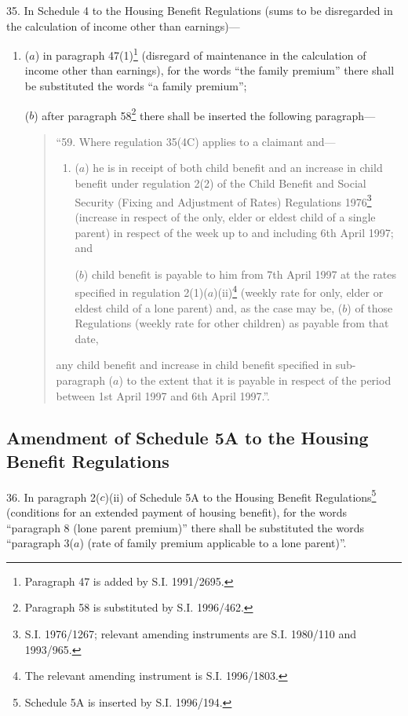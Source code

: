 \documentclass[12pt,a4paper]{article}
\begin{document}
35.  In Schedule 4 to the Housing Benefit Regulations (sums to be disregarded in the calculation of income other than earnings)—
\begin{enumerate}\item[]
($a$) in paragraph 47(1)\footnote{\frenchspacing Paragraph 47 is added by S.I. 1991/2695.} (disregard of maintenance in the calculation of income other than earnings), for the words “the family premium” there shall be substituted the words “a family premium”;

($b$) after paragraph 58\footnote{\frenchspacing Paragraph 58 is substituted by S.I. 1996/462.} there shall be inserted the following paragraph—
\begin{quotation}
“59.  Where regulation 35(4C) applies to a claimant and—
\begin{enumerate}\item[]
($a$) he is in receipt of both child benefit and an increase in child benefit under regulation 2(2) of the Child Benefit and Social Security (Fixing and Adjustment of Rates) Regulations 1976\footnote{\frenchspacing S.I. 1976/1267; relevant amending instruments are S.I. 1980/110 and 1993/965.} (increase in respect of the only, elder or eldest child of a single parent) in respect of the week up to and including 6th April 1997; and

($b$) child benefit is payable to him from 7th April 1997 at the rates specified in regulation 2(1)($a$)(ii)\footnote{\frenchspacing The relevant amending instrument is S.I. 1996/1803.} (weekly rate for only, elder or eldest child of a lone parent) and, as the case may be, ($b$) of those Regulations (weekly rate for other children) as payable from that date,
\end{enumerate}
any child benefit and increase in child benefit specified in sub-paragraph ($a$) to the extent that it is payable in respect of the period between 1st April 1997 and 6th April 1997.”.
\end{quotation}
\end{enumerate}

\subsection[36. Amendment of Schedule 5A to the Housing Benefit Regulations]{Amendment of Schedule 5A to the Housing Benefit Regulations}

36.  In paragraph 2($c$)(ii) of Schedule 5A to the Housing Benefit Regulations\footnote{\frenchspacing Schedule 5A is inserted by S.I. 1996/194.} (conditions for an extended payment of housing benefit), for the words “paragraph 8 (lone parent premium)” there shall be substituted the words “paragraph 3($a$) (rate of family premium applicable to a lone parent)”.
\end{document}
